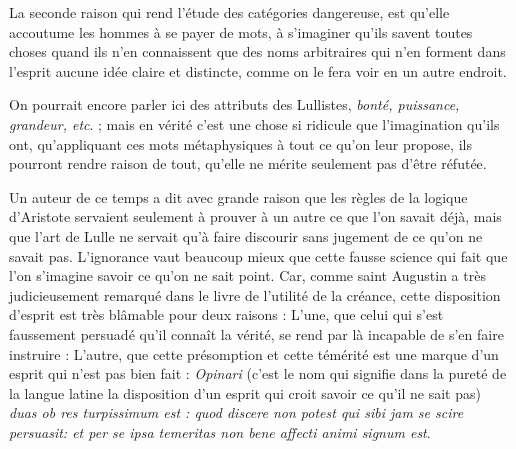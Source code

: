 La seconde raison qui rend l'étude des catégories dangereuse, est qu'elle accoutume les hommes à se payer de mots, à s'imaginer qu'ils savent toutes choses quand ils n'en connaissent que des noms arbitraires qui n'en forment dans l'esprit aucune idée claire et distincte, comme on le fera voir en un autre endroit.

On pourrait encore parler ici des attributs des Lullistes, \emph{bonté, puissance, grandeur, etc}. ; mais en vérité c'est une chose si ridicule que l'imagination qu'ils ont, qu'appliquant ces mots métaphysiques à tout ce qu'on leur propose, ils pourront rendre raison de tout, qu'elle ne mérite seulement pas d'être réfutée.

Un auteur de ce temps a dit avec grande raison que les règles de la logique d'Aristote servaient seulement à prouver à un autre ce que l'on savait déjà, mais que l'art de Lulle ne servait qu'à faire discourir sans jugement de ce qu'on ne savait pas. L'ignorance vaut beaucoup mieux que cette fausse science qui fait que l'on s'imagine savoir ce qu'on ne sait point. Car, comme saint Augustin a très judicieusement remarqué dans le livre de l'utilité de la créance, cette disposition d'esprit est très blâmable pour deux raisons : L'une, que celui qui s'est faussement persuadé qu'il connaît la vérité, se rend par là incapable de s'en faire instruire : L'autre, que cette présomption et cette témérité est une marque d'un esprit qui n'est pas bien fait : \emph{Opinari} (c'est le nom qui signifie dans la pureté de la langue latine la disposition d'un esprit qui croit savoir ce qu'il ne sait pas) \emph{duas ob res turpissimum est : quod discere non potest qui sibi jam se scire persuasit: et per se ipsa temeritas non bene affecti animi signum est}.
